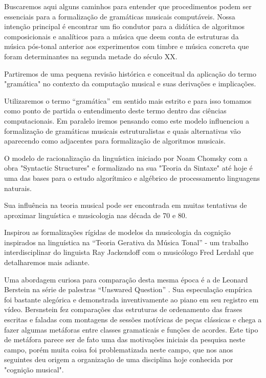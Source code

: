 \documentclass[
	12pt,				%
	openright,			%
	twoside,			%
	a4paper,			%
	english,			%
	french,				%
	spanish,			%
	brazil				%
	]{abntex2}
\begin{document}
Buscaremos aqui alguns caminhos para entender que procedimentos podem ser essenciais para a formalização de gramáticas musicais computáveis. Nossa intenção principal é encontrar um fio condutor para a didática de algoritmos composicionais e analíticos para a música que deem conta de estruturas da música pós-tonal anterior aos experimentos com timbre e música concreta que foram determinantes na segunda metade do século XX.  

Partiremos de uma pequena revisão histórica e conceitual da aplicação do termo "gramática" no contexto da computação musical e suas derivações e implicações.  

Utilizaremos o termo “gramática” em sentido mais estrito e para isso tomamos como ponto de partida o entendimento deste termo dentro das ciências computacionais. Em paralelo iremos pensando como este modelo influenciou a formalização de gramáticas musicais estruturalistas e quais alternativas vão aparecendo como adjacentes para formalização de algoritmos musicais.

O modelo de racionalização da linguística iniciado por Noam Chomsky com a obra "Syntactic Structures" \cite{chomsky1957syntactic} e formalizado na sua "Teoria da Sintaxe"\cite{chomsky1965aspects}  até hoje é uma das bases para o estudo algorítmico e algébrico de processamento linguagens naturais.  

Sua influência na teoria musical pode ser encontrada em muitas tentativas de aproximar linguística e musicologia nas década de 70 e 80.

Inspirou as formalizações rígidas de modelos da musicologia da cognição inspirados na linguística na “Teoria Gerativa da Música Tonal” \cite{lerdahl1983generative} - um trabalho interdisciplinar do linguista Ray Jackendoff com o musicólogo Fred Lerdahl que detalharemos mais adiante.

Uma abordagem curiosa para comparação desta mesma época é a de Leonard Berstein na série de palestras “Unswared Question” \cite{bernstein1976unanswered}. Sua especulação empírica foi bastante alegórica e demonstrada inventivamente ao piano em seu registro em vídeo. Bersnstein fez comparações das estruturas de ordenamento das frases escritas e faladas com montagens de sessões motívicas de peças clássicas e chega a fazer algumas metáforas entre classes gramaticais e funções de acordes. Este tipo de metáfora parece ser de fato uma das motivações iniciais da pesquisa neste campo, porém muita coisa foi problematizada neste campo, que nos anos seguintes deu origem a organização de uma disciplina hoje conhecida por "cognição musical".
\end{document}
